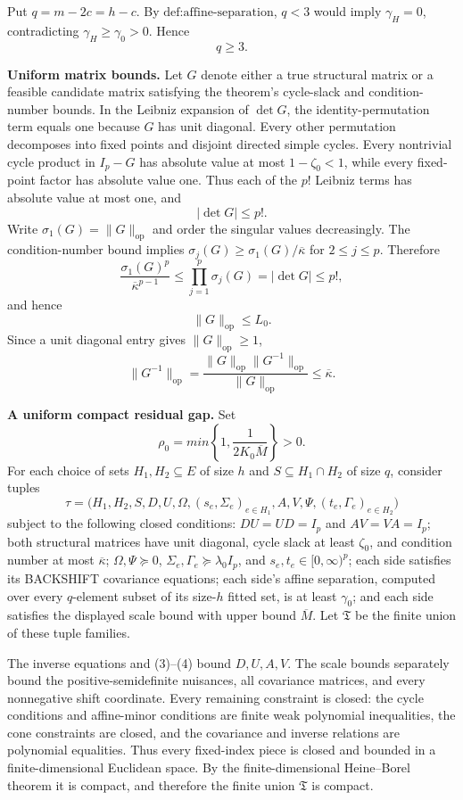 Put \(q=m-2c=h-c\). By \(\text{def:affine-separation}\), \(q<3\) would imply \(\gamma_H=0\), contradicting \(\gamma_H\geq\gamma_0>0\). Hence
\[
q\geq3.
\tag{1}
\]

\textbf{Uniform matrix bounds.}
Let \(G\) denote either a true structural matrix or a feasible candidate matrix satisfying the theorem's cycle-slack and condition-number bounds. In the Leibniz expansion of \(\det G\), the identity-permutation term equals one because \(G\) has unit diagonal. Every other permutation decomposes into fixed points and disjoint directed simple cycles. Every nontrivial cycle product in \(I_p-G\) has absolute value at most \(1-\zeta_0<1\), while every fixed-point factor has absolute value one. Thus each of the \(p!\) Leibniz terms has absolute value at most one, and
\[
|\det G|\leq p!.
\tag{2}
\]
Write \(\sigma_1(G)=\|G\|_{\mathrm{op}}\) and order the singular values decreasingly. The condition-number bound implies \(\sigma_j(G)\geq\sigma_1(G)/\overline\kappa\) for \(2\leq j\leq p\). Therefore
\[
\frac{\sigma_1(G)^p}{\overline\kappa^{p-1}}
\leq\prod_{j=1}^p\sigma_j(G)
=|\det G|
\leq p!,
\]
and hence
\[
\|G\|_{\mathrm{op}}\leq L_0.
\tag{3}
\]
Since a unit diagonal entry gives \(\|G\|_{\mathrm{op}}\geq1\),
\[
\|G^{-1}\|_{\mathrm{op}}
=\frac{\|G\|_{\mathrm{op}}\|G^{-1}\|_{\mathrm{op}}}
{\|G\|_{\mathrm{op}}}
\leq\overline\kappa.
\tag{4}
\]

\textbf{A uniform compact residual gap.}
Set
\[
\rho_0=min\left\{1,\frac{1}{2K_0\overline M}\right\}>0.
\tag{5}
\]
For each choice of sets \(H_1,H_2\subseteq E\) of size \(h\) and \(S\subseteq H_1\cap H_2\) of size \(q\), consider tuples
\[
\tau=\bigl(H_1,H_2,S,D,U,\Omega,(s_e,\Sigma_e)_{e\in H_1},
A,V,\Psi,(t_e,\Gamma_e)_{e\in H_2}\bigr)
\]
subject to the following closed conditions: \(DU=UD=I_p\) and \(AV=VA=I_p\); both structural matrices have unit diagonal, cycle slack at least \(\zeta_0\), and condition number at most \(\overline\kappa\); \(\Omega,\Psi\succeq0\), \(\Sigma_e,\Gamma_e\succeq\lambda_0I_p\), and \(s_e,t_e\in[0,\infty)^p\); each side satisfies its BACKSHIFT covariance equations; each side's affine separation, computed over every \(q\)-element subset of its size-\(h\) fitted set, is at least \(\gamma_0\); and each side satisfies the displayed scale bound with upper bound \(\overline M\). Let \(\mathfrak T\) be the finite union of these tuple families.

The inverse equations and (3)--(4) bound \(D,U,A,V\). The scale bounds separately bound the positive-semidefinite nuisances, all covariance matrices, and every nonnegative shift coordinate. Every remaining constraint is closed: the cycle conditions and affine-minor conditions are finite weak polynomial inequalities, the cone constraints are closed, and the covariance and inverse relations are polynomial equalities. Thus every fixed-index piece is closed and bounded in a finite-dimensional Euclidean space. By the finite-dimensional Heine--Borel theorem it is compact, and therefore the finite union \(\mathfrak T\) is compact.


